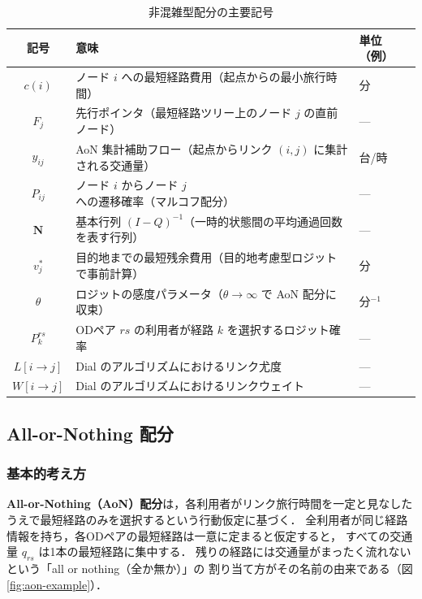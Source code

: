 \begin{table}[hbtp]
  \centering
  \caption{非混雑型配分の主要記号}
  \label{tab:ch2-notation}
  \begin{tabular}{cll}
    \toprule
    記号 & 意味 & 単位（例） \\
    \midrule
    $c(i)$          & ノード $i$ への最短経路費用（起点からの最小旅行時間） & 分 \\
    $F_j$           & 先行ポインタ（最短経路ツリー上のノード $j$ の直前ノード） & — \\
    $y_{ij}$        & AoN 集計補助フロー（起点からリンク $(i,j)$ に集計される交通量） & 台/時 \\
    $P_{ij}$        & ノード $i$ からノード $j$ への遷移確率（マルコフ配分） & — \\
    $\mathbf{N}$    & 基本行列 $(I-Q)^{-1}$（一時的状態間の平均通過回数を表す行列） & — \\
    $v_j^*$         & 目的地までの最短残余費用（目的地考慮型ロジットで事前計算） & 分 \\
    $\theta$        & ロジットの感度パラメータ（$\theta\to\infty$ で AoN 配分に収束） & 分$^{-1}$ \\
    $P_k^{rs}$      & ODペア $rs$ の利用者が経路 $k$ を選択するロジット確率 & — \\
    $L[i\to j]$    & Dial のアルゴリズムにおけるリンク尤度 & — \\
    $W[i\to j]$    & Dial のアルゴリズムにおけるリンクウェイト & — \\
    \bottomrule
  \end{tabular}
\end{table}

\subsection{All-or-Nothing 配分}
\label{subsec:aon}

\subsubsection*{基本的考え方}

\textbf{All-or-Nothing（AoN）配分}は，各利用者がリンク旅行時間を一定と見なした
うえで最短経路のみを選択するという行動仮定に基づく\cite{土木学会1998}．
全利用者が同じ経路情報を持ち，各ODペアの最短経路は一意に定まると仮定すると，
すべての交通量 $q_{rs}$ は1本の最短経路に集中する．
残りの経路には交通量がまったく流れないという「all or nothing（全か無か）」の
割り当て方がその名前の由来である（図\ref{fig:aon-example}）．


